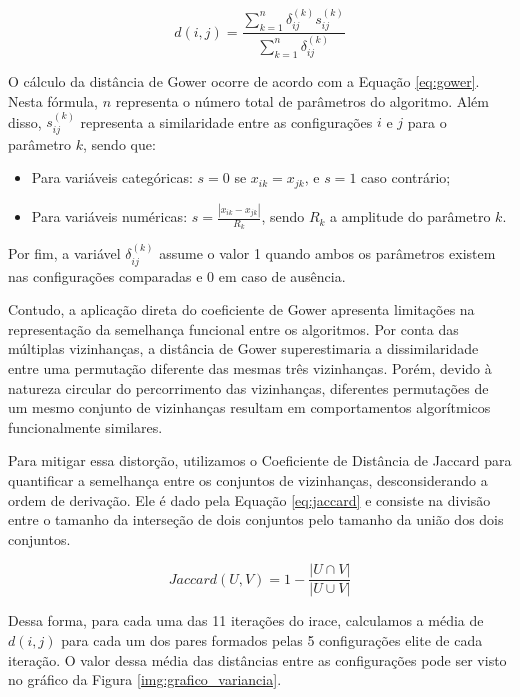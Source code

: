 \begin{equation} \label{eq:gower}
    d(i,j) = \frac{\sum_{k=1}^n \delta_{ij}^{(k)} s_{ij}^{(k)}}{\sum_{k=1}^n \delta_{ij}^{(k)}}
\end{equation}

O cálculo da distância de Gower ocorre de acordo com a Equação \ref{eq:gower}. Nesta fórmula, $n$ representa o número total de parâmetros do algoritmo. Além disso, $s_{ij}^{(k)}$ representa a similaridade entre as configurações $i$ e $j$ para o parâmetro $k$, sendo que:

\begin{itemize}
    \item Para variáveis categóricas: $s=0$ se $x_{ik} = x_{jk}$, e $s=1$ caso contrário;
    \item Para variáveis numéricas: $s = \frac{|x_{ik} - x_{jk}|}{R_k}$, sendo $R_k$ a amplitude do parâmetro $k$.
\end{itemize}

Por fim, a variável $\delta_{ij}^{(k)}$ assume o valor 1 quando ambos os parâmetros existem nas configurações comparadas e 0 em caso de ausência.

Contudo, a aplicação direta do coeficiente de Gower apresenta limitações na representação da semelhança funcional entre os algoritmos. Por conta das múltiplas vizinhanças, a distância de Gower superestimaria a dissimilaridade entre uma permutação diferente das mesmas três vizinhanças. Porém, devido à natureza circular do percorrimento das vizinhanças, diferentes permutações de um mesmo conjunto de vizinhanças resultam em comportamentos algorítmicos funcionalmente similares.

Para mitigar essa distorção, utilizamos o Coeficiente de Distância de Jaccard \citep{jaccard1901etude} para quantificar a semelhança entre os conjuntos de vizinhanças, desconsiderando a ordem de derivação. Ele é dado pela Equação \ref{eq:jaccard} e consiste na divisão entre o tamanho da interseção de dois conjuntos pelo tamanho da união dos dois conjuntos.

\begin{equation} \label{eq:jaccard}
    Jaccard(U,V) = 1 - \frac{|U \cap V|}{|U \cup V|}
\end{equation}

Dessa forma, para cada uma das 11 iterações do irace, calculamos a média de $d(i,j)$ para cada um dos pares formados pelas 5 configurações elite de cada iteração. O valor dessa média das distâncias entre as configurações pode ser visto no gráfico da Figura \ref{img:grafico_variancia}.

